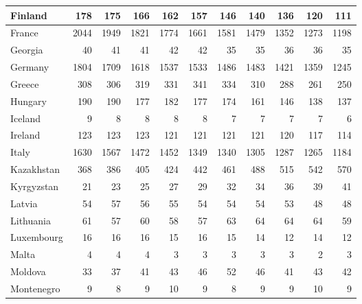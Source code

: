 \begin{table}
\begin{tabular}{|l|r|r|r|r|r|r|r|r|r|r|}
                       Finland&    178&    175&    166&    162&    157&    146&    140&    136&    120&    111\\\hline
                        France&   2044&   1949&   1821&   1774&   1661&   1581&   1479&   1352&   1273&   1198\\\hline
                       Georgia&     40&     41&     41&     42&     42&     35&     35&     36&     36&     35\\\hline
                       Germany&   1804&   1709&   1618&   1537&   1533&   1486&   1483&   1421&   1359&   1245\\\hline
                        Greece&    308&    306&    319&    331&    341&    334&    310&    288&    261&    250\\\hline
                       Hungary&    190&    190&    177&    182&    177&    174&    161&    146&    138&    137\\\hline
                       Iceland&      9&      8&      8&      8&      8&      7&      7&      7&      7&      6\\\hline
                       Ireland&    123&    123&    123&    121&    121&    121&    121&    120&    117&    114\\\hline
                         Italy&   1630&   1567&   1472&   1452&   1349&   1340&   1305&   1287&   1265&   1184\\\hline
                    Kazakhstan&    368&    386&    405&    424&    442&    461&    488&    515&    542&    570\\\hline
                    Kyrgyzstan&     21&     23&     25&     27&     29&     32&     34&     36&     39&     41\\\hline
                        Latvia&     54&     57&     56&     55&     54&     54&     54&     53&     48&     48\\\hline
                     Lithuania&     61&     57&     60&     58&     57&     63&     64&     64&     64&     59\\\hline
                    Luxembourg&     16&     16&     16&     15&     16&     15&     14&     12&     14&     12\\\hline
                         Malta&      4&      4&      4&      3&      3&      3&      3&      3&      2&      3\\\hline
                       Moldova&     33&     37&     41&     43&     46&     52&     46&     41&     43&     42\\\hline
                    Montenegro&      9&      8&      9&     10&      9&      8&      9&      9&     10&      9\\\hline

\end{tabular}
\end{table}
